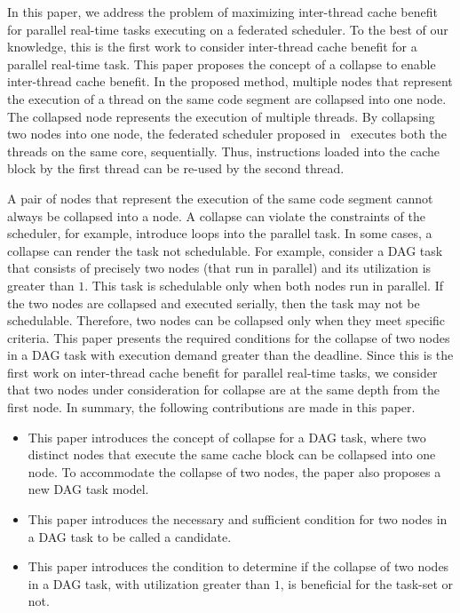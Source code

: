 In this paper, we address the problem of maximizing inter-thread cache benefit for parallel real-time tasks executing on a federated scheduler.  To the best of our knowledge, this is the first work to consider inter-thread cache benefit for a parallel real-time task. This paper proposes the concept of a collapse to enable inter-thread cache benefit. In the proposed method, multiple nodes that represent the execution of a thread on the same code segment are collapsed into one node. The collapsed node represents the execution of multiple threads.  By collapsing two nodes into one node, the federated scheduler proposed in~\cite{li2014federated} executes both the threads on the same core, sequentially. Thus, instructions loaded into the cache block by the first thread can be re-used by the second thread. 

A pair of nodes that represent the execution of the same code segment cannot always be collapsed into a node. A collapse can violate the constraints of the scheduler, for example, introduce loops into the parallel task. In some cases, a collapse can render the task not schedulable. For example, consider a DAG task that consists of precisely two nodes (that run in parallel) and its utilization is greater than $1$.  This task is schedulable only when both nodes run in parallel. If the two nodes are collapsed and executed serially, then the task may not be schedulable. Therefore, two nodes can be collapsed only when they meet specific criteria. This paper presents the required conditions for the collapse of two nodes in a DAG task with execution demand greater than the deadline. Since this is the first work on inter-thread cache benefit for parallel real-time tasks, we consider that two nodes under consideration for collapse are at the same depth from the first node. In summary, the following contributions are made in this paper.
\begin{itemize}
	\item This paper introduces the concept of collapse for a DAG task, where two distinct nodes that execute the same cache block can be collapsed into one node. To accommodate the collapse of two nodes, the paper also proposes a new DAG task model.
	\item This paper introduces the necessary and sufficient condition for two nodes in a DAG task to be called a candidate.
	\item This paper introduces the condition to determine if the collapse of two nodes in a DAG task, with utilization greater than $1$, is beneficial for the task-set or not.
\end{itemize}

